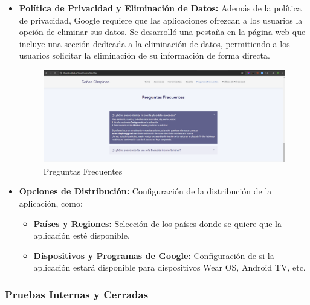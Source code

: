 \begin{itemize}
    \item \textbf{Política de Privacidad y Eliminación de Datos:} Además de la política de privacidad, Google requiere que las aplicaciones ofrezcan a los usuarios la opción de eliminar sus datos. Se desarrolló una pestaña en la página web que incluye una sección dedicada a la eliminación de datos, permitiendo a los usuarios solicitar la eliminación de su información de forma directa.

    \begin{figure} [H]
        \centering
        \includegraphics[width=1\linewidth]{figuras/pagina_web_preguntas.png}
        \caption{Preguntas Frecuentes}
        \label{fig:enter-label}
    \end{figure}
        
        
    \item \textbf{Opciones de Distribución:} Configuración de la distribución de la aplicación, como:
    \begin{itemize}
        \item \textbf{Países y Regiones:} Selección de los países donde se quiere que la aplicación esté disponible.
        \item \textbf{Dispositivos y Programas de Google:} Configuración de si la aplicación estará disponible para dispositivos Wear OS, Android TV, etc.
    \end{itemize}
\end{itemize}

\subsubsection{Pruebas Internas y Cerradas}

